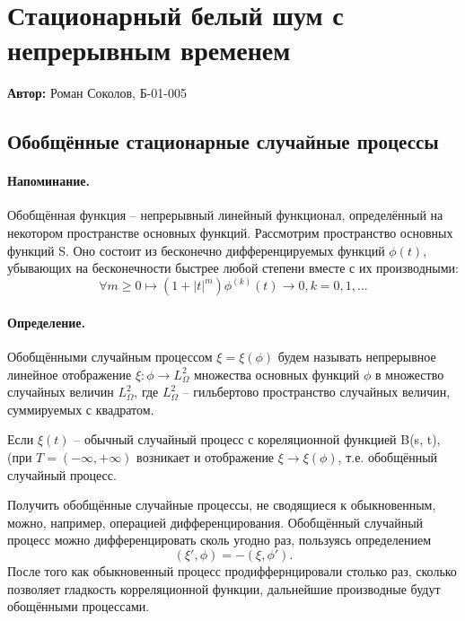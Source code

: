 

\section{Стационарный белый шум с непрерывным временем}

\textbf{Автор:} Роман Соколов, Б-01-005

\subsection{Обобщённые стационарные случайные процессы}

\paragraph{Напоминание.}
Обобщённая функция -- непрерывный линейный функционал, определённый на некотором пространстве основных функций. 
Рассмотрим пространство основных функций S. Оно состоит из бесконечно дифференцируемых функций $\phi(t)$, убывающих на бесконечности быстрее любой степени вместе с их производными:
$$\forall m \geq 0 \mapsto (1 + |t|^m)\phi^{(k)}(t) \longrightarrow 0, k = 0, 1, ...$$
\paragraph{Определение. } Обобщёнными случайным процессом $\xi = \xi(\phi)$ будем называть непрерывное линейное отображение $\xi:\phi \longrightarrow L_{\Omega}^2$ множества основных функций $\phi$ в множество случайных величин $L_{\Omega}^2$, где $L^2_{\Omega}$ -- гильбертово пространство случайных величин, суммируемых с квадратом.

Если $\xi(t)$ -- обычный случайный процесс с кореляционной функцией B(s, t), (при $T = (-\infty, +\infty)$ возникает и отображение  $\xi \longrightarrow \xi(\phi)$, т.е. обобщённый случайный процесс.

Получить обобщённые случайные процессы, не сводящиеся к обыкновенным, можно, например, операцией дифференцирования. Обобщённый случайный процесс можно дифференцировать сколь угодно раз, пользуясь определением $$(\xi', \phi) = -(\xi, \phi').$$ После того как обыкновенный процесс продиффернцировали столько раз, сколько позволяет гладкость корреляционной функции, дальнейшие производные будут обощёнными процессами.

